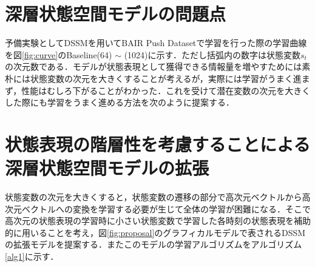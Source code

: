 \documentclass[10pt, twocolumn]{jarticle}
\begin{document}
\section{深層状態空間モデルの問題点}
予備実験としてDSSMを用いてBAIR Push Datasetで学習を行った際の学習曲線を図\ref{fig:curve}のBaseline(64) $\sim$ (1024)に示す．ただし括弧内の数字は状態変数$s_t$の次元数である．モデルが状態表現として獲得できる情報量を増やすためには素朴には状態変数の次元を大きくすることが考えるが，実際には学習がうまく進まず，性能はむしろ下がることがわかった．これを受けて潜在変数の次元を大きくした際にも学習をうまく進める方法を次のように提案する．





\section{状態表現の階層性を考慮することによる\\深層状態空間モデルの拡張}
\label{chap:proposal}
状態変数の次元を大きくすると，状態変数の遷移の部分で高次元ベクトルから高次元ベクトルへの変換を学習する必要が生じて全体の学習が困難になる．そこで高次元の状態表現の学習時に小さい状態変数で学習した各時刻の状態表現を補助的に用いることを考え，図\ref{fig:proposal}のグラフィカルモデルで表されるDSSMの拡張モデルを提案する．またこのモデルの学習アルゴリズムをアルゴリズム\ref{alg1}に示す．
\end{document}
